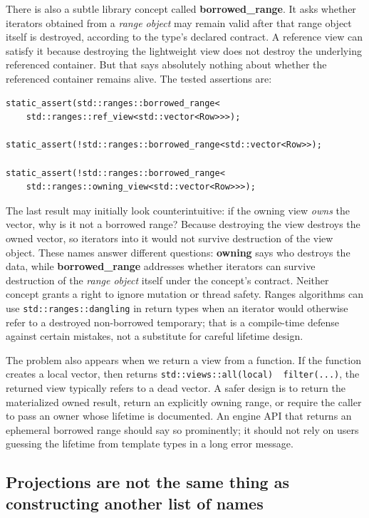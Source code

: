 There is also a subtle library concept called \textbf{borrowed\_range}. It asks whether iterators obtained from a \emph{range object} may remain valid after that range object itself is destroyed, according to the type's declared contract. A reference view can satisfy it because destroying the lightweight view does not destroy the underlying referenced container. But that says absolutely nothing about whether the referenced container remains alive. The tested assertions are:

\begin{verbatim}
static_assert(std::ranges::borrowed_range<
    std::ranges::ref_view<std::vector<Row>>>);

static_assert(!std::ranges::borrowed_range<std::vector<Row>>);

static_assert(!std::ranges::borrowed_range<
    std::ranges::owning_view<std::vector<Row>>>);
\end{verbatim}

The last result may initially look counterintuitive: if the owning view \emph{owns} the vector, why is it not a borrowed range? Because destroying the view destroys the owned vector, so iterators into it would not survive destruction of the view object. These names answer different questions: \textbf{owning} says who destroys the data, while \textbf{borrowed\_range} addresses whether iterators can survive destruction of the \emph{range object} itself under the concept's contract. Neither concept grants a right to ignore mutation or thread safety. Ranges algorithms can use \texttt{std::ranges::dangling} in return types when an iterator would otherwise refer to a destroyed non-borrowed temporary; that is a compile-time defense against certain mistakes, not a substitute for careful lifetime design.

The problem also appears when we return a view from a function. If the function creates a local vector, then returns \texttt{std::views::all(local)\ \textbar{}\ filter(...)}, the returned view typically refers to a dead vector. A safer design is to return the materialized owned result, return an explicitly owning range, or require the caller to pass an owner whose lifetime is documented. An engine API that returns an ephemeral borrowed range should say so prominently; it should not rely on users guessing the lifetime from template types in a long error message.

\subsection{Projections are not the same thing as constructing another list of names}\label{05-engine-i-ch006-projections-are-not-the-same-thing-as-constructing-another-list-of-names}

